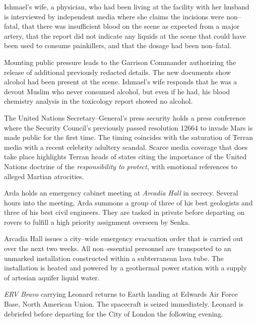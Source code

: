 Ishmael's wife, a physician, who had been living at the facility with her husband is interviewed by independent media where she claims the incisions were non--fatal, that there was insufficient blood on the scene as expected from a major artery, that the report did not indicate any liquids at the scene that could have been used to consume painkillers, and that the dosage had been non--fatal.

Mounting public pressure leads to the Garrison Commander authorizing the release of additional previously redacted details. The new documents show alcohol had been present at the scene. Ishmael's wife responds that he was a devout Muslim who never consumed alcohol, but even if he had, his blood chemistry analysis in the toxicology report showed no alcohol.
\StopTimelineDate

The United Nations Secretary--General's press security holds a press conference where the Security Council's previously passed resolution 12664 to invade Mars is made public for the first time. The timing coincides with the saturation of Terran media with a recent celebrity adultery scandal. Scarce media coverage that does take place highlights Terran heads of states citing the importance of the United Nations doctrine of the {\it responsibility to protect}, with emotional references to alleged Martian atrocities.
\StopTimelineDate

Arda holds an emergency cabinet meeting at {\it Arcadia Hall} in secrecy. Several hours into the meeting, Arda summons a group of three of his best geologists and three of his best civil engineers. They are tasked in private before departing on rovers to fulfill a high priority assignment overseen by Senka.
\StopTimelineDate

Arcadia Hall issues a city--wide emergency evacuation order that is carried out over the next two weeks. All non--essential personnel are transported to an unmarked installation constructed within a subterranean lava tube. The installation is heated and powered by a geothermal power station with a supply of artesian aquifer liquid water.
\StopTimelineDate

{\it ERV Bravo} carrying Leonard returns to Earth landing at Edwards Air Force Base, North American Union. The spacecraft is seized immediately. Leonard is debriefed before departing for the City of London the following evening.
\StopTimelineDate


